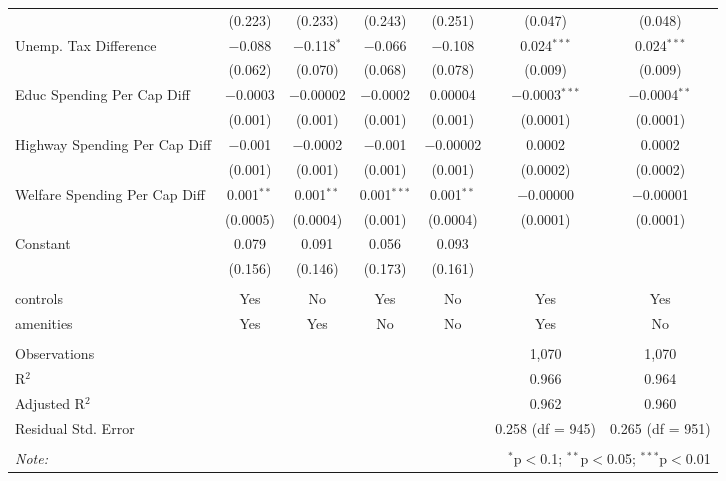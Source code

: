 \begin{table}[!htbp]
\begin{tabular}{@{\extracolsep{5pt}}lcccccc}
  & (0.223) & (0.233) & (0.243) & (0.251) & (0.047) & (0.048) \\ 
  Unemp. Tax Difference & $-$0.088 & $-$0.118$^{*}$ & $-$0.066 & $-$0.108 & 0.024$^{***}$ & 0.024$^{***}$ \\ 
  & (0.062) & (0.070) & (0.068) & (0.078) & (0.009) & (0.009) \\ 
  Educ Spending Per Cap Diff & $-$0.0003 & $-$0.00002 & $-$0.0002 & 0.00004 & $-$0.0003$^{***}$ & $-$0.0004$^{**}$ \\ 
  & (0.001) & (0.001) & (0.001) & (0.001) & (0.0001) & (0.0001) \\ 
  Highway Spending Per Cap Diff & $-$0.001 & $-$0.0002 & $-$0.001 & $-$0.00002 & 0.0002 & 0.0002 \\ 
  & (0.001) & (0.001) & (0.001) & (0.001) & (0.0002) & (0.0002) \\ 
  Welfare Spending Per Cap Diff & 0.001$^{**}$ & 0.001$^{**}$ & 0.001$^{***}$ & 0.001$^{**}$ & $-$0.00000 & $-$0.00001 \\ 
  & (0.0005) & (0.0004) & (0.001) & (0.0004) & (0.0001) & (0.0001) \\ 
  Constant & 0.079 & 0.091 & 0.056 & 0.093 &  &  \\ 
  & (0.156) & (0.146) & (0.173) & (0.161) &  &  \\ 
 \hline \\[-1.8ex] 
controls & Yes & No & Yes & No & Yes & Yes \\ 
amenities & Yes & Yes & No & No & Yes & No \\ 
\hline \\[-1.8ex] 
Observations &  &  &  &  & 1,070 & 1,070 \\ 
R$^{2}$ &  &  &  &  & 0.966 & 0.964 \\ 
Adjusted R$^{2}$ &  &  &  &  & 0.962 & 0.960 \\ 
Residual Std. Error &  &  &  &  & 0.258 (df = 945) & 0.265 (df = 951) \\ 
\hline 
\hline \\[-1.8ex] 
\textit{Note:}  & \multicolumn{6}{r}{$^{*}$p$<$0.1; $^{**}$p$<$0.05; $^{***}$p$<$0.01} \\ 
\end{tabular} 
\end{table} 
